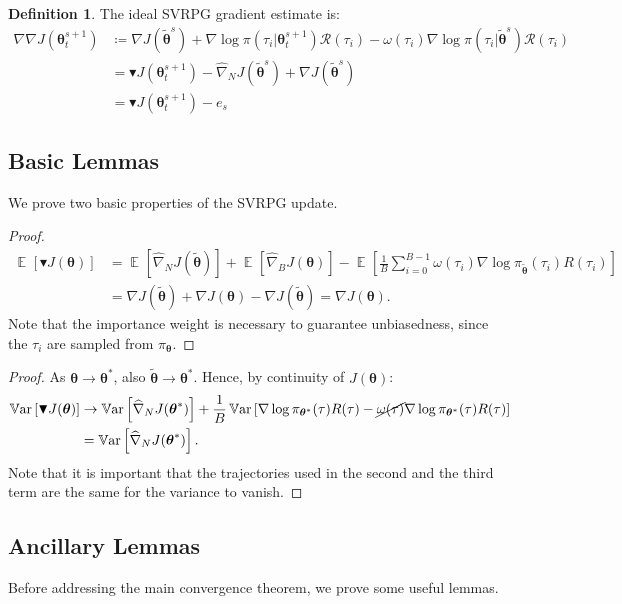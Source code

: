 \documentclass{article}
\theoremstyle{remark}
\theoremstyle{definition}
\newtheorem{definition}{Definition}[section]
\DeclareMathOperator*{\EV}{\mathbb{E}}
\DeclareMathOperator*{\Var}{\mathbb{V}ar}
\newcommand{\EVV}[2][\ppvect \in \ppspace]{\EV_{#1}\left[{#2}\right]}
\newcommand{\dnabla}{\nabla\!\!\!\!\nabla}
\newcommand{\vtheta}{\boldsymbol{\theta}}
\newcommand{\Reward}{\mathcal{R}}
\newcommand{\score}[2]{\nabla\log\pi_{#1}(#2)}
\newcommand{\gradJ}[1]{\nabla J(#1)}
\newcommand{\gradApp}[2]{\widehat{\nabla}_{#2}J(#1)}
\newcommand{\gradBlack}[1]{\blacktriangledown J(#1)}
\newcommand{\gradIdeal}[1]{\dnabla J(#1)}
\begin{document}
\begin{definition}\label{def:ideal}
The ideal SVRPG gradient estimate is:
\begin{align*}
	\gradIdeal{\vtheta_t^{s+1}} &\coloneqq 
	\gradJ{\tilde{\vtheta}^s}
	+ \nabla\log\pi(\tau_i \vert \vtheta_t^{s+1})\Reward(\tau_i) 
	- \omega(\tau_i)\nabla\log\pi(\tau_i \vert \tilde{\vtheta}^s)\Reward(\tau_i) \\
	&= \gradBlack{\vtheta_t^{s+1}} - \gradApp{\tilde{\vtheta}^s}{N} + \gradJ{\tilde{\vtheta}^s} \\
	&= \gradBlack{\vtheta_t^{s+1}} - e_s
\end{align*}
\end{definition}


\subsection*{Basic Lemmas}
We prove two basic properties of the SVRPG update.

\unbias*
\begin{proof}
\begin{align*}
\EVV[]{\gradBlack{\vtheta}} &= \EVV[]{\gradApp{\tilde{\vtheta}}{N}}  + \EVV[]{\gradApp{\vtheta}{B}} - \EVV[]{\frac{1}{B}\sum_{i=0}^{B-1}\omega(\tau_i)\score{\tilde{\vtheta}}{\tau_i}R(\tau_i)} \\
&= \gradJ{\tilde{\vtheta}} + \gradJ{\vtheta} - \gradJ{\tilde{\vtheta}} = \gradJ{\vtheta}.
\end{align*}
Note that the importance weight is necessary to guarantee unbiasedness, since the $\tau_i$ are sampled from $\pi_{\vtheta}$.
\end{proof}

\zerovar*
\begin{proof}
As $\vtheta\to\vtheta^*$, also $\tilde{\vtheta}\to\vtheta^*$. Hence, by continuity of $J(\vtheta)$:
\begin{align*}
\Var\left[\gradBlack{\vtheta}\right] &\to \Var\left[\gradApp{\vtheta^*}{N}\right] + \frac{1}{B}\Var\left[\score{\vtheta^*}{\tau}R(\tau) - \cancel{\omega(\tau)}\score{\vtheta^*}{\tau}R(\tau)\right] \\
&= \Var\left[\gradApp{\vtheta^*}{N}\right].
\end{align*}
Note that it is important that the trajectories used in the second and the third term are the same for the variance to vanish.
\end{proof}

\subsection*{Ancillary Lemmas}
Before addressing the main convergence theorem, we prove some useful lemmas.
\end{document}
